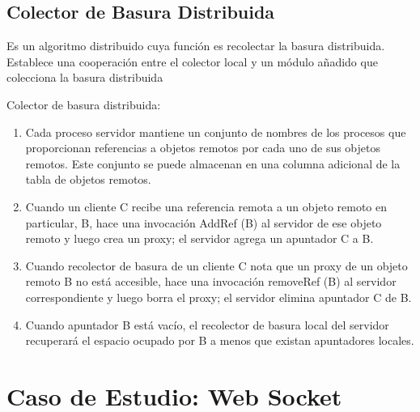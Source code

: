 \subsection*{Colector de Basura Distribuida} 
Es un algoritmo distribuido cuya funci\'on es  recolectar la basura distribuida. Establece una cooperación entre el colector local y un módulo añadido que colecciona la basura distribuida

Colector de basura distribuida:
\begin{enumerate}
	\item  Cada proceso servidor mantiene un conjunto de nombres de los procesos que proporcionan referencias a objetos remotos por cada uno de sus objetos remotos. Este conjunto se puede almacenan en una columna adicional de la tabla de objetos remotos.
	\item Cuando un cliente C recibe una referencia remota a un objeto remoto en particular, B,  hace una invocación AddRef (B) al servidor de ese objeto remoto y luego crea un proxy; el servidor agrega un apuntador C a B.
	\item  Cuando  recolector de basura de un cliente C nota que un proxy de un objeto remoto B no está accesible, hace una invocación removeRef (B) al servidor correspondiente y luego borra el proxy; el servidor elimina apuntador C de B.
	\item Cuando apuntador B está vacío, el recolector de basura local del servidor recuperará el espacio ocupado por B a menos que existan apuntadores locales.
\end{enumerate}

\section{Caso de Estudio: Web Socket}